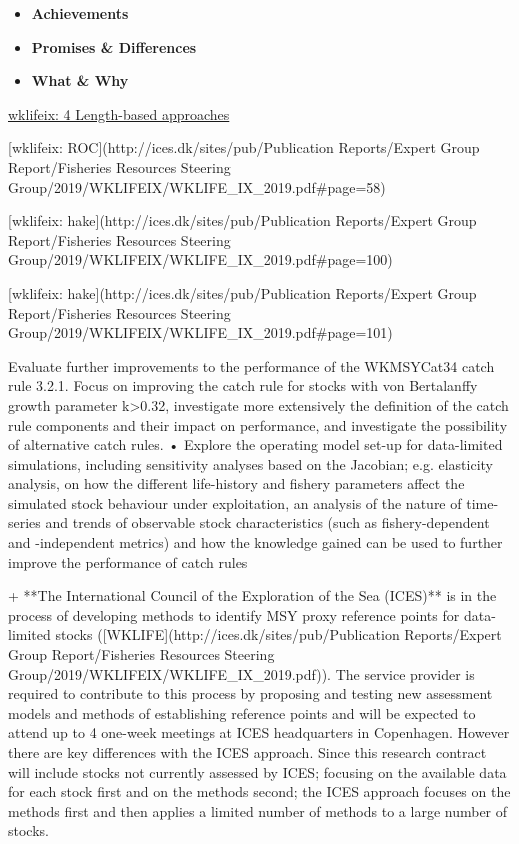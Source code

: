 \begin{itemize}[labelindent=\parindent,noitemsep,topsep=0pt,parsep=0pt,partopsep=0pt]
 \item \textbf{Achievements}
 \item \textbf{Promises \& Differences}
 \item \textbf{What \& Why}
\end{itemize}

\href{http://ices.dk/sites/pub/Publication Reports/Expert Group Report/Fisheries Resources Steering Group/2019/WKLIFEIX/WKLIFE_IX_2019.pdf#page=30}{wklifeix: 4 Length-based approaches}

[wklifeix: ROC](http://ices.dk/sites/pub/Publication Reports/Expert Group Report/Fisheries Resources Steering Group/2019/WKLIFEIX/WKLIFE_IX_2019.pdf#page=58)

[wklifeix: hake](http://ices.dk/sites/pub/Publication Reports/Expert Group Report/Fisheries Resources Steering Group/2019/WKLIFEIX/WKLIFE_IX_2019.pdf#page=100)

[wklifeix: hake](http://ices.dk/sites/pub/Publication Reports/Expert Group Report/Fisheries Resources Steering Group/2019/WKLIFEIX/WKLIFE_IX_2019.pdf#page=101)

Evaluate further improvements to the performance of the WKMSYCat34 catch rule 3.2.1.
Focus on improving the catch rule for stocks with von Bertalanffy growth parameter
k>0.32, investigate more extensively the definition of the catch rule components and their
impact on performance, and investigate the possibility of alternative catch rules.
• Explore the operating model set-up for data-limited simulations, including sensitivity
analyses based on the Jacobian; e.g. elasticity analysis, on how the different life-history
and fishery parameters affect the simulated stock behaviour under exploitation, an analysis of the nature of time-series and trends of observable stock characteristics (such as
fishery-dependent and -independent metrics) and how the knowledge gained can be
used to further improve the performance of catch rules

 + **The International Council of the Exploration of the Sea (ICES)** is in the process of developing methods to identify MSY proxy reference points for data-limited stocks ([WKLIFE](http://ices.dk/sites/pub/Publication Reports/Expert Group Report/Fisheries Resources Steering Group/2019/WKLIFEIX/WKLIFE_IX_2019.pdf)). The service provider is required to contribute to this process by proposing and testing new assessment models and methods of establishing reference points and will be expected to attend up to 4 one-week meetings at ICES headquarters in Copenhagen. However there are key differences with the ICES approach. Since this research contract will include stocks not currently assessed by ICES; focusing on the available data for each stock first and on the methods second; the ICES approach focuses on the methods first and then applies a limited number of methods to a large number of stocks.

